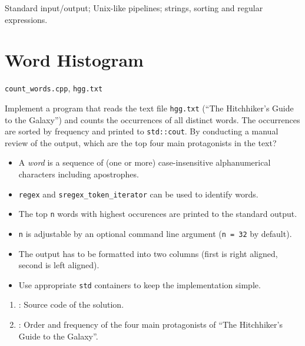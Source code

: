 \documentclass{cgsblatt}
\begin{document}

Standard input/output; Unix-like pipelines; strings, sorting and regular expressions. 



\section{Word Histogram}

 \verb|count_words.cpp|, \verb|hgg.txt|

Implement a program that 
reads the text file \texttt{hgg.txt} (\enquote{The Hitchhiker's Guide to the Galaxy}) 
and counts the occurrences of all distinct words. The occurrences are sorted by frequency and printed to \lstinline|std::cout|.
By conducting a manual review of the output, which are the top four main protagonists in the text?

\begin{itemize}
\item A \emph{word} is a sequence of (one or more) 
case-insensitive alphanumerical characters including apostrophes.
\item \lstinline|regex| and \lstinline|sregex_token_iterator| can be used to identify words.
\item The top \lstinline|n| words
with highest occurences are printed to the standard output.
\item \lstinline|n| is adjustable by an optional command line argument (\lstinline|n = 32| by default).
\item The output has to be formatted into two columns (first is right aligned, second is left aligned). 
\item Use appropriate \lstinline|std| containers to keep the implementation simple. 
\end{itemize}

\begin{enumerate}
	\item {} : Source code of the solution.
	\item {} : Order and frequency of the four main protagonists of \enquote{The Hitchhiker's Guide to the Galaxy}.
\end{enumerate}


\end{document}
